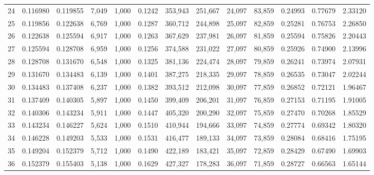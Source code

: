 \begin{tabular}{rrrrrrrrrrrrr}
24  &  0.116980 &  0.119855 &   7,049 &  1,000 &                                     0.1242 &  353,943 &  251,667 &   24,097 &   83,859 &  0.24993 &  0.77679 &  2.33120 \\
25  &  0.119856 &  0.122638 &   6,769 &  1,000 &                                     0.1287 &  360,712 &  244,898 &   25,097 &   82,859 &  0.25281 &  0.76753 &  2.26850 \\
26  &  0.122638 &  0.125594 &   6,917 &  1,000 &                                     0.1263 &  367,629 &  237,981 &   26,097 &   81,859 &  0.25594 &  0.75826 &  2.20443 \\
27  &  0.125594 &  0.128708 &   6,959 &  1,000 &                                     0.1256 &  374,588 &  231,022 &   27,097 &   80,859 &  0.25926 &  0.74900 &  2.13996 \\
28  &  0.128708 &  0.131670 &   6,548 &  1,000 &                                     0.1325 &  381,136 &  224,474 &   28,097 &   79,859 &  0.26241 &  0.73974 &  2.07931 \\
29  &  0.131670 &  0.134483 &   6,139 &  1,000 &                                     0.1401 &  387,275 &  218,335 &   29,097 &   78,859 &  0.26535 &  0.73047 &  2.02244 \\
30  &  0.134483 &  0.137408 &   6,237 &  1,000 &                                     0.1382 &  393,512 &  212,098 &   30,097 &   77,859 &  0.26852 &  0.72121 &  1.96467 \\
31  &  0.137409 &  0.140305 &   5,897 &  1,000 &                                     0.1450 &  399,409 &  206,201 &   31,097 &   76,859 &  0.27153 &  0.71195 &  1.91005 \\
32  &  0.140306 &  0.143234 &   5,911 &  1,000 &                                     0.1447 &  405,320 &  200,290 &   32,097 &   75,859 &  0.27470 &  0.70268 &  1.85529 \\
33  &  0.143234 &  0.146227 &   5,624 &  1,000 &                                     0.1510 &  410,944 &  194,666 &   33,097 &   74,859 &  0.27774 &  0.69342 &  1.80320 \\
34  &  0.146228 &  0.149203 &   5,533 &  1,000 &                                     0.1531 &  416,477 &  189,133 &   34,097 &   73,859 &  0.28084 &  0.68416 &  1.75195 \\
35  &  0.149204 &  0.152379 &   5,712 &  1,000 &                                     0.1490 &  422,189 &  183,421 &   35,097 &   72,859 &  0.28429 &  0.67490 &  1.69903 \\
36  &  0.152379 &  0.155403 &   5,138 &  1,000 &                                     0.1629 &  427,327 &  178,283 &   36,097 &   71,859 &  0.28727 &  0.66563 &  1.65144 \\

\end{tabular}
